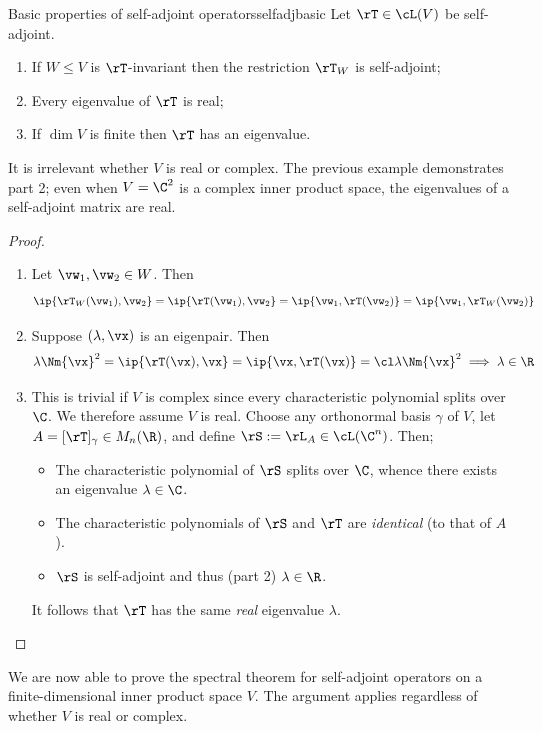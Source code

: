 

\begin{lemm}{Basic properties of self-adjoint operators}{selfadjbasic}
Let $\rT\in\cL(V)$ be self-adjoint.
\begin{enumerate}\itemsep2pt
  \item If $W\le V$ is $\rT$-invariant then the restriction $\at\rT W$ is self-adjoint;
  \item Every eigenvalue of $\rT$ is real;
  \item If $\dim V$ is finite then $\rT$ has an eigenvalue.
\end{enumerate}
\end{lemm}

It is irrelevant whether $V$ is real or complex. The previous example demonstrates part 2; even when $V=\C^2$ is a complex inner product space, the eigenvalues of a self-adjoint matrix are real.

\begin{proof}
\begin{enumerate}\itemsep2pt
  \item Let $\vw_1,\vw_2\in W$. Then
  \[\ip{\at\rT W(\vw_1),\vw_2}= \ip{\rT(\vw_1),\vw_2}= \ip{\vw_1,\rT(\vw_2)} =\ip{\vw_1,\at\rT W(\vw_2)}\]
  \item Suppose $(\lambda,\vx)$ is an eigenpair. Then
  \[\lambda\Nm{\vx}^2=\ip{\rT(\vx),\vx}=\ip{\vx,\rT(\vx)}=\cl\lambda\Nm{\vx}^2\implies \lambda\in\R\]
  \item This is trivial if $V$ is complex since every characteristic polynomial splits over $\C$. We therefore assume $V$ is real. Choose any orthonormal basis $\gamma$ of $V$, let $A=[\rT]_\gamma\in M_n(\R)$, and define $\rS:=\rL_A\in\cL(\C^{n})$. Then;
	\begin{itemize}\itemsep2pt
	  \item The characteristic polynomial of $\rS$ splits over $\C$, whence there exists an eigenvalue $\lambda\in\C$.
  	\item The characteristic polynomials of $\rS$ and $\rT$ are \emph{identical} (to that of $A$).
  	\item $\rS$ is self-adjoint and thus (part 2) $\lambda\in\R$.
	\end{itemize}
  It follows that $\rT$ has the same \emph{real} eigenvalue $\lambda$.\qedhere
\end{enumerate}
\end{proof}

We are now able to prove the spectral theorem for self-adjoint operators on a finite-dimensional inner product space $V$. The argument applies regardless of whether $V$ is real or complex.

